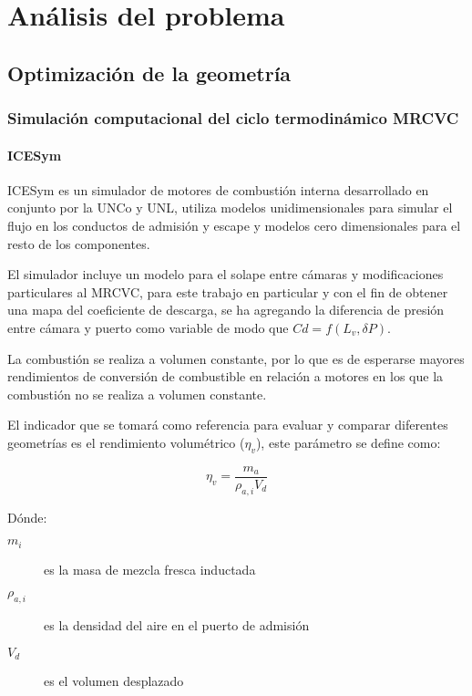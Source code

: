 \chapter{Análisis del problema}

\section{Optimización de la geometría}

\subsection{Simulación computacional del ciclo termodinámico MRCVC}

\subsubsection{ICESym}

ICESym \cite{icesym} es un simulador de motores de combustión interna
desarrollado en conjunto por la UNCo y UNL, utiliza modelos unidimensionales
para simular el flujo en los conductos de admisión y escape y modelos cero
dimensionales para el resto de los componentes.

El simulador incluye un modelo para el solape entre cámaras \cite{lopez16} y
modificaciones particulares al MRCVC, para este trabajo en particular  y con el
fin de obtener una mapa del coeficiente de descarga, se ha agregando la
diferencia de presión entre cámara y puerto como variable de modo que $Cd =
f(L_v, \delta P)$.

La combustión se realiza a volumen constante, por lo que es de esperarse
mayores rendimientos de conversión de combustible en relación a motores en los
que la combustión no se realiza a volumen constante.

El indicador que se tomará como referencia para evaluar y comparar diferentes
geometrías es el rendimiento volumétrico ($\eta_v$), este parámetro se define
como:

\begin{equation}
    \eta_v = \frac{m_a}{\rho_{a,i}V_d}
\end{equation}

Dónde:
\begin{description}
    \item[$m_i$] es la masa de mezcla fresca inductada
    \item[$\rho_{a,i}$] es la densidad del aire en el puerto de admisión
    \item[$V_d$] es el volumen desplazado
\end{description}

